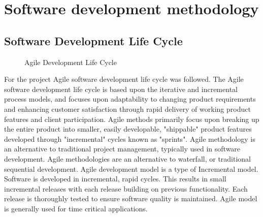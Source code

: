 \section{Software development methodology}
\subsection{Software Development Life Cycle}
\begin{figure}[h!]\centering
	\caption{Agile Development Life Cycle}
	\label{fig:agile}
\end{figure}

For the project Agile software development life cycle was followed. \cite{ad} The Agile software development life cycle is based upon the iterative and incremental process models, and focuses upon adaptability to changing product requirements and enhancing customer satisfaction through rapid delivery of working product features and client participation. Agile methods primarily focus upon breaking up the entire product into smaller, easily developable, "shippable" product features developed through "incremental" cycles known as "sprints". Agile methodology is an alternative to traditional project management, typically used in software development. Agile methodologies are an alternative to waterfall, or traditional sequential development. Agile development model is a type of Incremental model. Software is developed in incremental, rapid cycles. This results in small incremental releases with each release building on previous functionality. Each release is thoroughly tested to ensure software quality is maintained. Agile model is generally used for time critical applications.

